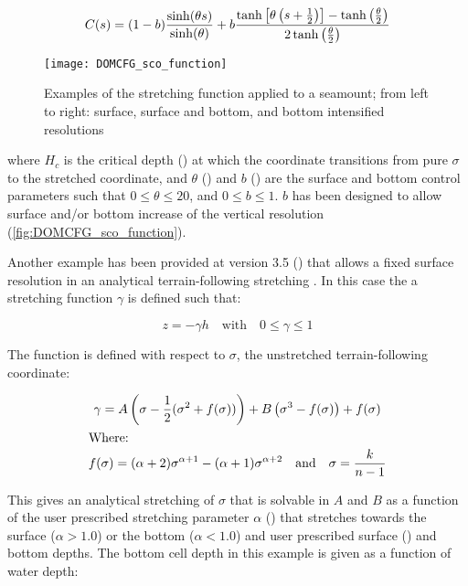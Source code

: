 \documentclass[../main/NEMO_manual]{subfiles}
\begin{document}
\[
  C(s) =   (1 - b) \frac{\sinh(\theta s)}{\sinh(\theta)}
         + b       \frac{\tanh \left[ \theta \left(s + \frac{1}{2} \right) \right] -   \tanh \left( \frac{\theta}{2} \right)}
                        {                                                  2 \tanh \left( \frac{\theta}{2} \right)}
 \label{eq:DOMCFG_SH94_2}
\]

\begin{figure}[!ht]
  \centering
  \texttt{[image: DOMCFG\_sco\_function]}
  \caption[DOMAINcfg: examples of the stretching function applied to a seamount]{
    Examples of the stretching function applied to a seamount;
    from left to right: surface, surface and bottom, and bottom intensified resolutions}
  \label{fig:DOMCFG_sco_function}
\end{figure}

where $H_c$ is the critical depth () at which the coordinate transitions from pure $\sigma$ to
the stretched coordinate, and $\theta$ () and $b$ () are the surface and
bottom control parameters such that $0 \leqslant \theta \leqslant 20$, and $0 \leqslant b \leqslant 1$.
$b$ has been designed to allow surface and/or bottom increase of the vertical resolution
(\autoref{fig:DOMCFG_sco_function}).

Another example has been provided at version 3.5 () that allows a fixed surface resolution in
an analytical terrain-following stretching \citet{siddorn.furner_OM13}.
In this case the a stretching function $\gamma$ is defined such that:

\begin{equation}
  z = - \gamma h \quad \text{with} \quad 0 \leq \gamma \leq 1
\end{equation}

The function is defined with respect to $\sigma$, the unstretched terrain-following coordinate:

\begin{gather*}
  \gamma =   A \left( \sigma   - \frac{1}{2} (\sigma^2     + f (\sigma)) \right)
           + B \left( \sigma^3 - f           (\sigma) \right) + f (\sigma)       \\
  \intertext{Where:}
 \label{eq:DOMCFG_gamma}
  f(\sigma) = (\alpha + 2) \sigma^{\alpha + 1} - (\alpha + 1) \sigma^{\alpha + 2}
  \quad \text{and} \quad \sigma = \frac{k}{n - 1}
\end{gather*}

This gives an analytical stretching of $\sigma$ that is solvable in $A$ and $B$ as a function of
the user prescribed stretching parameter $\alpha$ () that stretches towards
the surface ($\alpha > 1.0$) or the bottom ($\alpha < 1.0$) and
user prescribed surface () and bottom depths.
The bottom cell depth in this example is given as a function of water depth:
\end{document}
